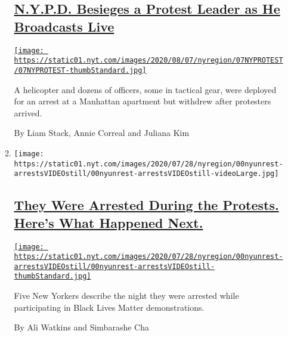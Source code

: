 \begin{enumerate}
\begin{enumerate}
    \hypertarget{nypd-besieges-a-protest-leader-as-he-broadcasts-live}{%
    \subsection{\texorpdfstring{\href{/2020/08/07/nyregion/nypd-derrick-ingram-protester.html}{N.Y.P.D.
    Besieges a Protest Leader as He Broadcasts
    Live}}{N.Y.P.D. Besieges a Protest Leader as He Broadcasts Live}}\label{nypd-besieges-a-protest-leader-as-he-broadcasts-live}}

    \href{/2020/08/07/nyregion/nypd-derrick-ingram-protester.html}{\texttt{[image: https://static01.nyt.com/images/2020/08/07/nyregion/07NYPROTEST/07NYPROTEST-thumbStandard.jpg]}}

    A helicopter and dozens of officers, some in tactical gear, were
    deployed for an arrest at a Manhattan apartment but withdrew after
    protesters arrived.

    By Liam Stack, Annie Correal and Juliana Kim
  \item
    \texttt{[image: https://static01.nyt.com/images/2020/07/28/nyregion/00nyunrest-arrestsVIDEOstill/00nyunrest-arrestsVIDEOstill-videoLarge.jpg]}

    \hypertarget{they-were-arrested-during-the-protests-heres-what-happened-next}{%
    \subsection{\texorpdfstring{\href{/2020/08/07/nyregion/ny-protest-arrests.html}{They
    Were Arrested During the Protests. Here's What Happened
    Next.}}{They Were Arrested During the Protests. Here's What Happened Next.}}\label{they-were-arrested-during-the-protests-heres-what-happened-next}}

    \href{/2020/08/07/nyregion/ny-protest-arrests.html}{\texttt{[image: https://static01.nyt.com/images/2020/07/28/nyregion/00nyunrest-arrestsVIDEOstill/00nyunrest-arrestsVIDEOstill-thumbStandard.jpg]}}

    Five New Yorkers describe the night they were arrested while
    participating in Black Lives Matter demonstrations.

    By Ali Watkins and Simbarashe Cha
  \end{enumerate}
\end{enumerate}

